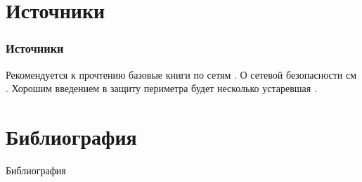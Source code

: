 
\appendix


\section{Источники}

\begin{frame}
    \frametitle{Источники}
    
    Рекомендуется к прочтению базовые книги по сетям \cite{bib:olifers:networks,bib:tannen:networks}. О сетевой безопасности см \cite{bib:shangin:2012:secInNetworks}. Хорошим введением в защиту периметра будет несколько устаревшая \cite{bib:lebed:2002:firewalls}.
\end{frame}

\section{Библиография}

\begin{frame}[allowframebreaks]{Библиография}
    
    
\end{frame}


